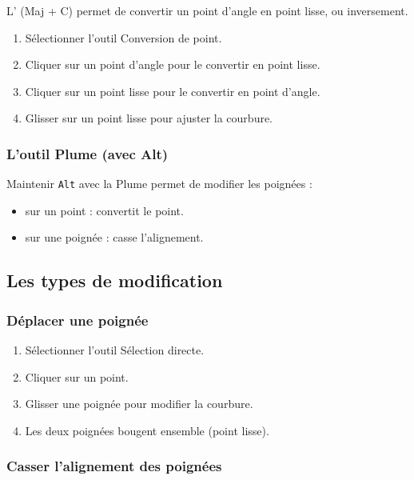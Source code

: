 L' (Maj + C) permet de convertir un point d'angle en point lisse, ou inversement.

\begin{enumerate}
    \item Sélectionner l'outil Conversion de point.
    \item Cliquer sur un point d'angle pour le convertir en point lisse.
    \item Cliquer sur un point lisse pour le convertir en point d'angle.
    \item Glisser sur un point lisse pour ajuster la courbure.
\end{enumerate}

\subsubsection{L'outil Plume (avec Alt)}

Maintenir \texttt{Alt} avec la Plume permet de modifier les poignées :

\begin{itemize}
    \item {} sur un point : convertit le point.
    \item {} sur une poignée : casse l'alignement.
\end{itemize}

\subsection{Les types de modification}

\subsubsection{Déplacer une poignée}

\begin{enumerate}
    \item Sélectionner l'outil Sélection directe.
    \item Cliquer sur un point.
    \item Glisser une poignée pour modifier la courbure.
    \item Les deux poignées bougent ensemble (point lisse).
\end{enumerate}

\subsubsection{Casser l'alignement des poignées}

